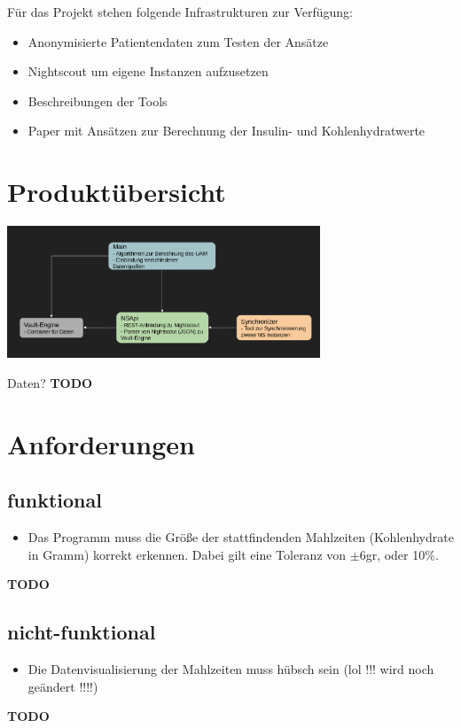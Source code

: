 \documentclass[accentcolor=tud0b,12pt,paper=a4]{tudreport}
\begin{document}
Für das Projekt stehen folgende Infrastrukturen zur Verfügung: 
\begin{itemize}
	\item Anonymisierte Patientendaten zum Testen der Ansätze
	\item Nightscout um eigene Instanzen aufzusetzen 
	\item Beschreibungen der Tools
	\item Paper mit Ansätzen zur Berechnung der Insulin- und Kohlenhydratwerte
\end{itemize}
	
	
{\let\clearpage\relax	\chapter{Produktübersicht}}
	

\begin{center}
\includegraphics[width=0.7\textwidth]{architektur.png}
\end{center}


Daten? \textbf{{\large TODO}}

	

 \chapter{Anforderungen}
	\section{funktional}
\begin{itemize}
	\item Das Programm muss die Größe der stattfindenden Mahlzeiten (Kohlenhydrate in Gramm) korrekt erkennen. Dabei gilt eine Toleranz von $\pm$6gr, oder 10\%.
\end{itemize}
	\textbf{{\large TODO}}
	
	\section{nicht-funktional}
\begin{itemize}
	\item Die Datenvisualisierung der Mahlzeiten muss hübsch sein  (lol !!! wird noch geändert !!!!)
\end{itemize}
	\textbf{{\large TODO}}
	
\end{document}
